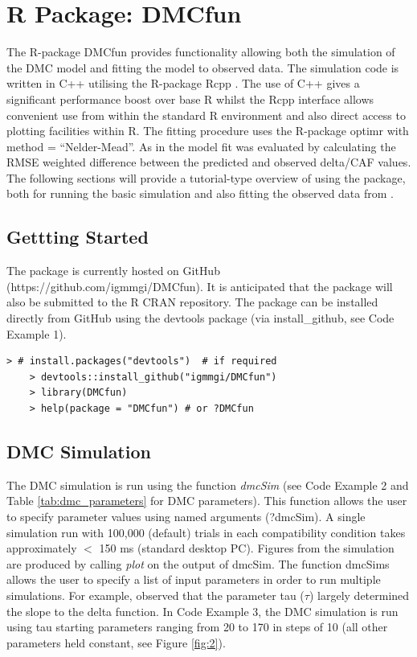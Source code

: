 \section{R Package: DMCfun} 
The R-package DMCfun provides functionality allowing both the simulation of the
DMC model and fitting the model to observed data. The simulation code is
written in C++ utilising the R-package Rcpp \parencite{eddelbuettel2011rcpp}.
The use of C++ gives a significant performance boost over base R whilst the
Rcpp interface allows convenient use from within the standard R environment
and also direct access to plotting facilities within R. The fitting procedure
uses the R-package optimr \textcite{optimr} with method = ``Nelder-Mead''. As in
\textcite{ulrich2015automatic} the model fit was evaluated by calculating the
RMSE weighted difference between the predicted and observed delta/CAF values.
The following sections will provide a tutorial-type overview of using the
package, both for running the basic simulation and also fitting the observed
data from \textcite{ulrich2015automatic}.

\label{dmc_fun}
\subsection{Gettting Started}
\label{getting_started}
The package is currently hosted on GitHub (https://github.com/igmmgi/DMCfun).
It is anticipated that the package will also be submitted to the R CRAN
repository. The package can be installed directly from GitHub using the
devtools package (via install\_github, see Code Example 1).

\begin{minipage}{\linewidth}
    \begin{lstlisting}[style = R, title={R Code Example 1: Instalation}, captionpos=t]
    > # install.packages("devtools")  # if required
    > devtools::install_github("igmmgi/DMCfun")
    > library(DMCfun)
    > help(package = "DMCfun") # or ?DMCfun
    \end{lstlisting}
\end{minipage}

\subsection{DMC Simulation}
\label{dmc_simulation}
The DMC simulation is run using the function \textit{dmcSim} (see Code Example
2 and Table \ref{tab:dmc_parameters} for DMC parameters). This function allows
the user to specify parameter values using named arguments (?dmcSim). A single
simulation run with 100,000 (default) trials in each compatibility condition
takes approximately $<$ 150 ms (standard desktop PC). Figures from the
simulation are produced by calling \textit{plot} on the output of dmcSim. The
function dmcSims allows the user to specify a list of input parameters in order
to run multiple simulations. For example, \textcite{ulrich2015automatic}
observed that the parameter tau ($\tau$) largely determined the slope to the
delta function. In Code Example 3, the DMC simulation is run using tau starting
parameters ranging from 20 to 170 in steps of 10 (all other parameters held constant,
see Figure \ref{fig:2}).

